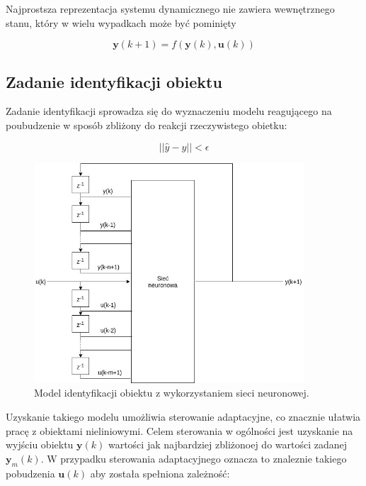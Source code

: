\documentclass{article}
\newcommand{\bb}{\textbf}
\begin{document}
Najprostsza reprezentacja systemu dynamicznego nie zawiera wewnętrznego stanu, który w wielu wypadkach może być pominięty

\begin{equation}
	\bb{y}(k+1) = f(\bb{y}(k),\bb{u}(k))
\end{equation}

\subsection{Zadanie identyfikacji obiektu}

Zadanie identyfikacji sprowadza się do wyznaczeniu modelu reagującego na poubudzenie w sposób zbliżony do reakcji rzeczywistego obietku:

\begin{equation}
	|| \hat{y} - y || < \epsilon
	\label{warunek}
\end{equation}

\begin{figure}
\centering
	\includegraphics[width=0.90\textwidth]{ident.jpg}\par\vspace{1cm}
\caption{Model identyfikacji obiektu z wykorzystaniem sieci neuronowej.}
	\label{fig:identyfikacja}
\end{figure}

Uzyskanie takiego modelu umożliwia sterowanie adaptacyjne, co znacznie ułatwia pracę z obiektami nieliniowymi. Celem sterowania w ogólności jest uzyskanie na wyjściu obiektu $\bb{y}(k)$ wartości jak najbardziej zbliżonoej do wartości zadanej $\bb{y}_m(k)$. W przypadku sterowania adaptacyjnego oznacza to znaleznie takiego pobudzenia $\bb{u}(k)$ aby została spełniona zależność:
\end{document}
